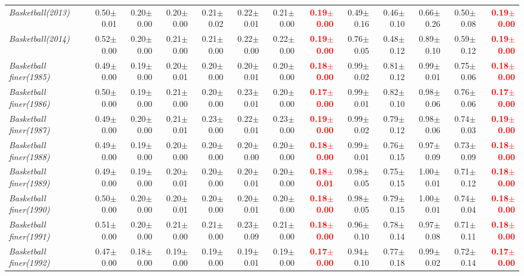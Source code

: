 \documentclass[nohyperref]{article}
\theoremstyle{plain}
\theoremstyle{definition}
\theoremstyle{remark}
\newcommand{\red}[1]{\textcolor{red}{\textbf{#1}}}
\begin{document}
\begin{table*}[!ht]
{\begin{tabular}{lrr|rrrrr|rrrrr}
			{\it Basketball(2013)} & 0.50$\pm$0.01 & 0.20$\pm$0.00 & 0.20$\pm$0.00 & 0.21$\pm$0.02 & 0.22$\pm$0.01 & 0.21$\pm$0.00 & \red{0.19$\pm$0.00} & 0.49$\pm$0.16 & 0.46$\pm$0.10 & 0.66$\pm$0.26 & 0.50$\pm$0.08 & \red{0.19$\pm$0.00} \\
			{\it Basketball(2014)} & 0.52$\pm$0.00 & 0.20$\pm$0.00 & 0.21$\pm$0.00 & 0.21$\pm$0.00 & 0.22$\pm$0.00 & 0.22$\pm$0.00 & \red{0.19$\pm$0.00} & 0.76$\pm$0.05 & 0.48$\pm$0.12 & 0.89$\pm$0.10 & 0.59$\pm$0.12 & \red{0.19$\pm$0.00} \\
			{\it Basketball finer(1985)} & 0.49$\pm$0.00 & 0.19$\pm$0.00 & 0.20$\pm$0.01 & 0.20$\pm$0.00 & 0.20$\pm$0.01 & 0.20$\pm$0.00 & \red{0.18$\pm$0.00} & 0.99$\pm$0.02 & 0.81$\pm$0.12 & 0.99$\pm$0.01 & 0.75$\pm$0.06 & \red{0.18$\pm$0.00} \\
			{\it Basketball finer(1986)} & 0.50$\pm$0.00 & 0.19$\pm$0.00 & 0.21$\pm$0.00 & 0.20$\pm$0.00 & 0.23$\pm$0.01 & 0.20$\pm$0.00 & \red{0.17$\pm$0.00} & 0.99$\pm$0.01 & 0.82$\pm$0.10 & 0.98$\pm$0.06 & 0.76$\pm$0.06 & \red{0.17$\pm$0.00} \\
			{\it Basketball finer(1987)} & 0.49$\pm$0.00 & 0.20$\pm$0.00 & 0.21$\pm$0.01 & 0.23$\pm$0.00 & 0.22$\pm$0.01 & 0.23$\pm$0.00 & \red{0.19$\pm$0.00} & 0.99$\pm$0.02 & 0.79$\pm$0.12 & 0.98$\pm$0.06 & 0.74$\pm$0.03 & \red{0.19$\pm$0.00} \\
			{\it Basketball finer(1988)} & 0.49$\pm$0.00 & 0.19$\pm$0.00 & 0.20$\pm$0.00 & 0.20$\pm$0.00 & 0.20$\pm$0.00 & 0.20$\pm$0.00 & \red{0.18$\pm$0.00} & 0.99$\pm$0.01 & 0.76$\pm$0.15 & 0.97$\pm$0.09 & 0.73$\pm$0.09 & \red{0.18$\pm$0.00} \\
			{\it Basketball finer(1989)} & 0.49$\pm$0.00 & 0.19$\pm$0.00 & 0.20$\pm$0.01 & 0.20$\pm$0.00 & 0.20$\pm$0.01 & 0.20$\pm$0.00 & \red{0.18$\pm$0.01} & 0.98$\pm$0.05 & 0.75$\pm$0.15 & 1.00$\pm$0.01 & 0.71$\pm$0.12 & \red{0.18$\pm$0.00} \\
			{\it Basketball finer(1990)} & 0.50$\pm$0.00 & 0.20$\pm$0.00 & 0.20$\pm$0.01 & 0.20$\pm$0.00 & 0.20$\pm$0.01 & 0.20$\pm$0.00 & \red{0.18$\pm$0.00} & 0.98$\pm$0.05 & 0.79$\pm$0.15 & 1.00$\pm$0.01 & 0.74$\pm$0.04 & \red{0.18$\pm$0.00} \\
			{\it Basketball finer(1991)} & 0.51$\pm$0.00 & 0.20$\pm$0.00 & 0.21$\pm$0.00 & 0.21$\pm$0.00 & 0.23$\pm$0.09 & 0.21$\pm$0.00 & \red{0.18$\pm$0.00} & 0.96$\pm$0.10 & 0.78$\pm$0.14 & 0.97$\pm$0.08 & 0.71$\pm$0.11 & \red{0.18$\pm$0.00} \\
			{\it Basketball finer(1992)} & 0.47$\pm$0.00 & 0.18$\pm$0.00 & 0.19$\pm$0.00 & 0.19$\pm$0.00 & 0.19$\pm$0.01 & 0.19$\pm$0.00 & \red{0.17$\pm$0.00} & 0.94$\pm$0.10 & 0.77$\pm$0.18 & 0.99$\pm$0.02 & 0.72$\pm$0.14 & \red{0.17$\pm$0.00} \\

\end{tabular}}
\end{table*}
\end{document}
